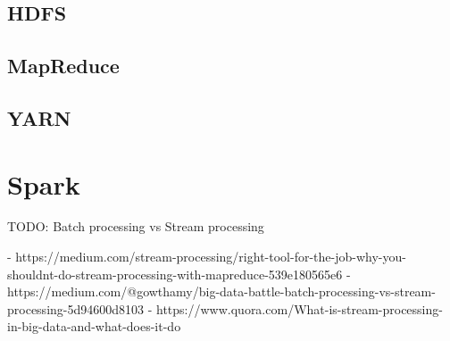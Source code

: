 \documentclass[12pt]{article}
\begin{document}
    \subsection{HDFS}
    \subsection{MapReduce}
    \subsection{YARN}

  \section{Spark}
    TODO:
    Batch processing vs Stream processing

    - https://medium.com/stream-processing/right-tool-for-the-job-why-you-shouldnt-do-stream-processing-with-mapreduce-539e180565e6
    - https://medium.com/@gowthamy/big-data-battle-batch-processing-vs-stream-processing-5d94600d8103
    - https://www.quora.com/What-is-stream-processing-in-big-data-and-what-does-it-do

  
  \printbibliography
  
\end{document}
